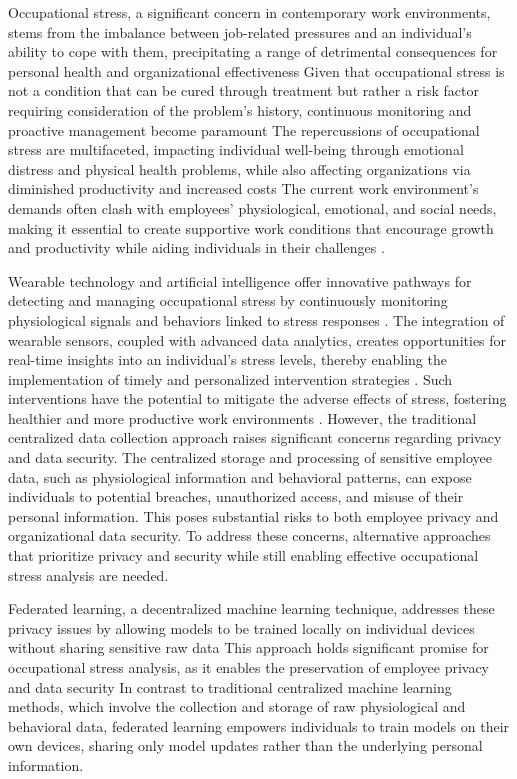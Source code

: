\documentclass[12pt]{article}
\begin{document}
Occupational stress, a significant concern in contemporary work environments, stems from the imbalance between job-related pressures and an individual's ability to cope with them, precipitating a range of detrimental consequences for personal health and organizational effectiveness Given that occupational stress is not a condition that can be cured through treatment but rather a risk factor requiring consideration of the problem's history, continuous monitoring and proactive management become paramount \cite{james_campbell_quick_f0fffc85} The repercussions of occupational stress are multifaceted, impacting individual well-being through emotional distress and physical health problems, while also affecting organizations via diminished productivity and increased costs \cite{james_campbell_quick_f0fffc85, paul_e__spector_2bae7a3d} The current work environment's demands often clash with employees' physiological, emotional, and social needs, making it essential to create supportive work conditions that encourage growth and productivity while aiding individuals in their challenges \cite{agnese_mariotti_dd5ad5ca}.


Wearable technology and artificial intelligence offer innovative pathways for detecting and managing occupational stress by continuously monitoring physiological signals and behaviors linked to stress responses \cite{james_campbell_quick_f0fffc85}. The integration of wearable sensors, coupled with advanced data analytics, creates opportunities for real-time insights into an individual's stress levels, thereby enabling the implementation of timely and personalized intervention strategies \cite{reham_alhejaili_14968434, mazin_alshamrani_65eed49a}. Such interventions have the potential to mitigate the adverse effects of stress, fostering healthier and more productive work environments \cite{jerry_chen_fd58cab0}. However, the traditional centralized data collection approach raises significant concerns regarding privacy and data security. The centralized storage and processing of sensitive employee data, such as physiological information and behavioral patterns, can expose individuals to potential breaches, unauthorized access, and misuse of their personal information. This poses substantial risks to both employee privacy and organizational data security. To address these concerns, alternative approaches that prioritize privacy and security while still enabling effective occupational stress analysis are needed.

Federated learning, a decentralized machine learning technique, addresses these privacy issues by allowing models to be trained locally on individual devices without sharing sensitive raw data \cite{yekta_said_can_3e1184b6} This approach holds significant promise for occupational stress analysis, as it enables the preservation of employee privacy and data security In contrast to traditional centralized machine learning methods, which involve the collection and storage of raw physiological and behavioral data, federated learning empowers individuals to train models on their own devices, sharing only model updates rather than the underlying personal information.
\end{document}
